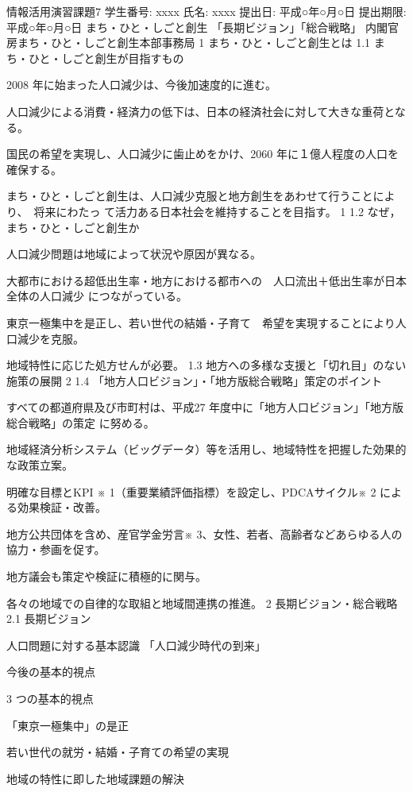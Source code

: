 情報活用演習課題7
学生番号: xxxx
氏名: xxxx
提出日: 平成○年○月○日
提出期限: 平成○年○月○日
まち・ひと・しごと創生
「長期ビジョン」「総合戦略」
内閣官房まち・ひと・しごと創生本部事務局
1 まち・ひと・しごと創生とは
1.1 まち・ひと・しごと創生が目指すもの
\item 2008 年に始まった人口減少は、今後加速度的に進む。
\item 人口減少による消費・経済力の低下は、日本の経済社会に対して大きな重荷となる。
\item 国民の希望を実現し、人口減少に歯止めをかけ、2060 年に１億人程度の人口を確保する。
\item まち・ひと・しごと創生は、人口減少克服と地方創生をあわせて行うことにより、　将来にわたっ
て活力ある日本社会を維持することを目指す。
1
1.2 なぜ，まち・ひと・しごと創生か
\item 人口減少問題は地域によって状況や原因が異なる。
\item 大都市における超低出生率・地方における都市への　人口流出＋低出生率が日本全体の人口減少
につながっている。
\item 東京一極集中を是正し、若い世代の結婚・子育て　希望を実現することにより人口減少を克服。
\item 地域特性に応じた処方せんが必要。
1.3 地方への多様な支援と「切れ目」のない施策の展開
2
1.4 「地方人口ビジョン」・「地方版総合戦略」策定のポイント
\item すべての都道府県及び市町村は、平成27 年度中に「地方人口ビジョン」「地方版総合戦略」の策定
に努める。
\item 地域経済分析システム（ビッグデータ）等を活用し、地域特性を把握した効果的な政策立案。
\item 明確な目標とKPI ※ 1（重要業績評価指標）を設定し、PDCAサイクル※ 2 による効果検証・改善。
\item 地方公共団体を含め、産官学金労言※ 3、女性、若者、高齢者などあらゆる人の協力・参画を促す。
\item 地方議会も策定や検証に積極的に関与。
\item 各々の地域での自律的な取組と地域間連携の推進。
2 長期ビジョン・総合戦略
2.1 長期ビジョン
\item 人口問題に対する基本認識
「人口減少時代の到来」
\item 今後の基本的視点
\item 3 つの基本的視点
\item 「東京一極集中」の是正
\item 若い世代の就労・結婚・子育ての希望の実現
\item 地域の特性に即した地域課題の解決
